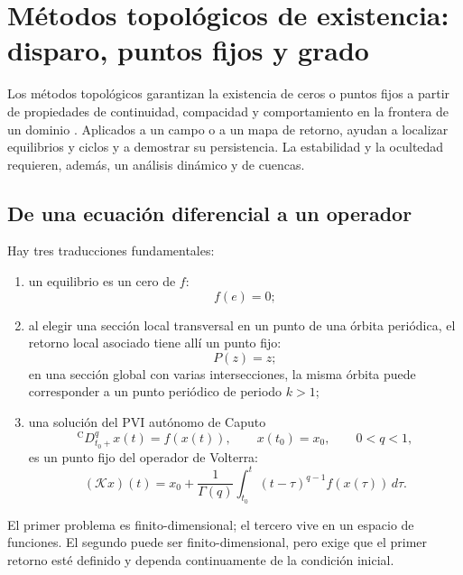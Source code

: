 \section{Métodos topológicos de existencia: disparo, puntos fijos y grado}
\label{sec:metodos-topologicos-existencia}

\HAFOCardExistence

Los métodos topológicos garantizan la existencia de ceros o puntos fijos a
partir de propiedades de continuidad, compacidad y comportamiento en la
frontera de un dominio \cite{Amster2021MetodosTopologicos}. Aplicados a un
campo o a un mapa de retorno, ayudan a localizar equilibrios y ciclos y a
demostrar su persistencia. La estabilidad y la ocultedad requieren, además,
un análisis dinámico y de cuencas.

\subsection{De una ecuación diferencial a un operador}

Hay tres traducciones fundamentales:

\begin{enumerate}
 \item un equilibrio es un cero de $f$:
 \[
 f(e)=0;
 \]
 \item al elegir una sección local transversal en un punto de una órbita
 periódica, el retorno local asociado tiene allí un punto fijo:
 \[
  P(z)=z;
 \]
 en una sección global con varias intersecciones, la misma órbita puede
 corresponder a un punto periódico de periodo \(k>1\);
 \item una solución del PVI autónomo de Caputo
 \[
  {}^{\mathrm C}D_{t_0+}^{q}x(t)=f(x(t)),\qquad
  x(t_0)=x_0,\qquad 0<q<1,
 \]
 es un punto fijo del operador de Volterra:
 \begin{equation}
  (\mathcal Kx)(t)=x_0+
  \frac{1}{\Gamma(q)}\int_{t_0}^{t}(t-\tau)^{q-1}
  f(x(\tau))\,d\tau.
  \label{eq:guide-caputo-fixed-operator}
 \end{equation}
\end{enumerate}

El primer problema es finito-dimensional; el tercero vive en un espacio de
funciones. El segundo puede ser finito-dimensional, pero exige que el primer
retorno esté definido y dependa continuamente de la condición inicial.

